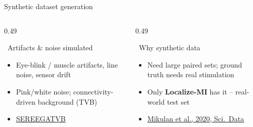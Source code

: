 \documentclass[aspectratio=169,t]{beamer}
\begin{document}
\begin{frame}{Synthetic dataset generation}
  \vspace{0.2mm}
  \begin{columns}[T,onlytextwidth]
    \begin{column}{0.49\textwidth}
      \begin{block}{\faSlidersH\;\, Artifacts \& noise simulated}
        \scriptsize
        \begin{itemize}\setlength\itemsep{0pt}\setlength\parskip{0pt}
          \item Eye-blink / muscle artifacts, line noise, sensor drift
          \item Pink/white noise; connectivity-driven background (TVB)
          \item \faLink\;\href{https://github.com/lrkrol/SEREEGA}{SEREEGA}\;\textbar\;\faLink\;\href{https://www.thevirtualbrain.org/}{TVB}
        \end{itemize}
      \end{block}
    \end{column}%
    \hfill
    \begin{column}{0.49\textwidth}
      \begin{alertblock}{\faLightbulb\;\, Why synthetic data}
        \scriptsize
        \begin{itemize}\setlength\itemsep{0pt}\setlength\parskip{0pt}
          \item Need large paired sets; ground truth needs real stimulation
          \item Only \textbf{Localize-MI} has it -- real-world test set
          \item \faLink\;\href{https://www.nature.com/articles/s41597-020-0467-x}{Mikulan et al., 2020, Sci.\ Data}
        \end{itemize}
      \end{alertblock}
    \end{column}
  \end{columns}
\end{frame}
\end{document}
